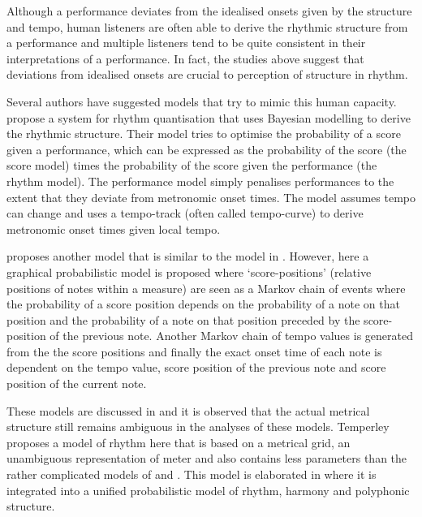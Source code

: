 Although a performance deviates from the idealised onsets given by the structure and tempo, human listeners are often able to derive the rhythmic structure from a performance and multiple listeners tend to be quite consistent in their interpretations of a performance. In fact, the studies above suggest that deviations from idealised onsets are crucial to perception of structure in rhythm.


Several authors have suggested models that try to mimic this human capacity. \citet{cemgil2000rhythm} propose a system for rhythm quantisation that uses Bayesian modelling to derive the rhythmic structure. Their model tries to optimise the probability of a score given a performance, which can be expressed as the probability of the score (the score model) times the probability of the score given the performance (the rhythm model). The performance model simply penalises performances to the extent that they deviate from metronomic onset times. The model assumes tempo can change and uses a tempo-track (often called tempo-curve) to derive metronomic onset times given local tempo. 

\citet{raphael2002hybrid} proposes another model that is similar to the model in \citet{cemgil2000rhythm}. However, here a graphical probabilistic model is proposed where `score-positions' (relative positions of notes within a measure) are seen as a Markov chain of events where the probability of a score position depends on the probability of a note on that position and the probability of a note on that position preceded by the score-position of the previous note. Another Markov chain of tempo values is generated from the the score positions and finally the exact onset time of each note is dependent on the tempo value, score position of the previous note and score position of the current note.

These models are discussed in \citet{temperley2007music} and it is observed that the actual metrical structure still remains ambiguous in the analyses of these models. Temperley proposes a model of rhythm here that is based on a metrical grid, an unambiguous representation of meter and also contains less parameters than the rather complicated models of \citet{raphael2002hybrid} and \citet{cemgil2000rhythm}. This model is elaborated in \citet{temperley2009unified} where it is integrated into a unified probabilistic model of rhythm, harmony and polyphonic structure.

